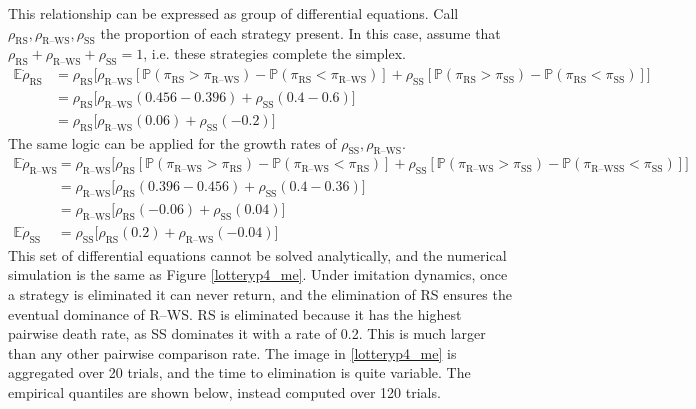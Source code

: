 This relationship can be expressed as group of differential equations. Call $\rho_{\text{RS}}, \rho_{\text{R--WS}}, \rho_{\text{SS}}$ the proportion of each strategy present. In this case, assume that $\rho_{\text{RS}}+ \rho_{\text{R--WS}}+ \rho_{\text{SS}} = 1$, i.e. these strategies complete the simplex.   \\
\begin{align*}
    \mathbb E \dot{\rho}_{\text{RS}} &= \rho_{\text{RS}} \Bigg [ \rho_{\text{R--WS}} [\mathbb P (\pi_\text{RS} > \pi_{\text{R--WS}}) -\mathbb P (\pi_\text{RS} < \pi_{\text{R--WS}}) ] + \rho_{\text{SS}} [\mathbb P (\pi_\text{RS} > \pi_{\text{SS}}) -\mathbb P (\pi_\text{RS} < \pi_{\text{SS}}) ] \Bigg ] \\
    &= \rho_{\text{RS}}\Bigg [ \rho_{\text{R--WS}}(0.456 - 0.396) + \rho_{\text{SS}}(0.4 - 0.6)  \Bigg ] \\
    &= \rho_{\text{RS}}\Bigg [ \rho_{\text{R--WS}}(0.06) + \rho_{\text{SS}}(-0.2)  \Bigg ]
\end{align*}
The same logic can be applied for the growth rates of $\rho_\text{SS}, \rho_\text{R--WS}$. \\
\begin{align*}
    \mathbb E \dot{\rho}_{\text{R--WS}} &= \rho_{\text{R--WS}} \Bigg [ \rho_{\text{RS}} [\mathbb P (\pi_\text{R--WS} > \pi_{\text{RS}}) -\mathbb P (\pi_\text{R--WS} < \pi_{\text{RS}}) ] + \rho_{\text{SS}} [\mathbb P (\pi_\text{R--WS} > \pi_{\text{SS}}) -\mathbb P (\pi_\text{R--WSS} < \pi_{\text{SS}}) ] \Bigg ] \\
    &= \rho_{\text{R--WS}}\Bigg [ \rho_{\text{RS}}(0.396-0.456) + \rho_{\text{SS}}(0.4 - 0.36)  \Bigg ] \\
    &= \rho_{\text{R--WS}}\Bigg [ \rho_{\text{RS}}(-0.06) + \rho_{\text{SS}}(0.04)  \Bigg ] \\
    \mathbb E \dot{\rho}_{\text{SS}}&= \rho_{\text{SS}}\Bigg [ \rho_{\text{RS}}(0.2) + \rho_{\text{R--WS}}(-0.04)  \Bigg ]
\end{align*}
This set of differential equations cannot be solved analytically, and the numerical simulation is the same as Figure \ref{lotteryp4_me}. Under imitation dynamics, once a strategy is eliminated it can never return, and the elimination of RS ensures the eventual dominance of R--WS. RS is eliminated because it has the highest pairwise death rate, as SS dominates it with a rate of 0.2. This is much larger than any other pairwise comparison rate. The image in \ref{lotteryp4_me} is aggregated over 20 trials, and the time to elimination is quite variable. The empirical quantiles are shown below, instead computed over 120 trials.  \\

